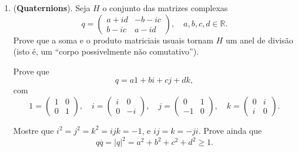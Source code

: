 \documentclass[a4paper,12pt]{article}
\begin{document}
\begin{enumerate}[label=10.\arabic*.]
    \item (\textbf{Quaternions}). Seja $H$ o conjunto das matrizes complexas 
    \[
    q = \begin{pmatrix} a+id & -b-ic \\ b-ic & a-id \end{pmatrix}, \quad a,b,c,d \in \mathbb{R}.
    \] 
    Prove que a soma e o produto matriciais usuais tornam $H$ um anel de divisão (isto é, um ``corpo possivelmente não comutativo''). 

    Prove que 
    \[
    q = a1 + b i + c j + d k,
    \] 
    com 
    \[
    1 = \begin{pmatrix} 1 & 0 \\ 0 & 1 \end{pmatrix}, \quad 
    i = \begin{pmatrix} i & 0 \\ 0 & -i \end{pmatrix}, \quad 
    j = \begin{pmatrix} 0 & 1 \\ -1 & 0 \end{pmatrix}, \quad 
    k = \begin{pmatrix} 0 & i \\ i & 0 \end{pmatrix}.
    \] 

    Mostre que $i^2 = j^2 = k^2 = ijk = -1$, e $ij = k = -ji$. Prove ainda que 
    \[
    q\overline{q} = |q|^2 = a^2 + b^2 + c^2 + d^2 \geq 1.
    \]

\end{enumerate}
\end{document}
